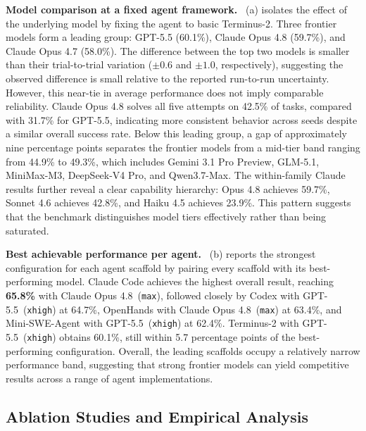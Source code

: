 \documentclass{llmxive}
\begin{document}
\noindent\textbf{Model comparison at a fixed agent framework.}
~(a) isolates the effect of the underlying model by fixing the agent to basic Terminus-2. Three frontier models form a leading group: GPT-5.5 (60.1\%), Claude Opus 4.8 (59.7\%), and Claude Opus 4.7 (58.0\%). The difference between the top two models is smaller than their trial-to-trial variation ($\pm0.6$ and $\pm1.0$, respectively), suggesting the observed difference is small relative to the reported run-to-run uncertainty. However, this near-tie in average performance does not imply comparable reliability. Claude Opus 4.8 solves all five attempts on 42.5\% of tasks, compared with 31.7\% for GPT-5.5, indicating more consistent behavior across seeds despite a similar overall success rate. Below this leading group, a gap of approximately nine percentage points separates the frontier models from a mid-tier band ranging from 44.9\% to 49.3\%, which includes Gemini 3.1 Pro Preview, GLM-5.1, MiniMax-M3, DeepSeek-V4 Pro, and Qwen3.7-Max. The within-family Claude results further reveal a clear capability hierarchy: Opus 4.8 achieves 59.7\%, Sonnet 4.6 achieves 42.8\%, and Haiku 4.5 achieves 23.9\%. This pattern suggests that the benchmark distinguishes model tiers effectively rather than being saturated.

\noindent\textbf{Best achievable performance per agent.}
~(b) reports the strongest configuration for each agent scaffold by pairing every scaffold with its best-performing model. Claude Code achieves the highest overall result, reaching \textbf{65.8\%} with Claude Opus 4.8~(\texttt{max}), followed closely by Codex with GPT-5.5~(\texttt{xhigh}) at 64.7\%, OpenHands with Claude Opus 4.8~(\texttt{max}) at 63.4\%, and Mini-SWE-Agent with GPT-5.5~(\texttt{xhigh}) at 62.4\%. Terminus-2 with GPT-5.5~(\texttt{xhigh}) obtains 60.1\%, still within 5.7 percentage points of the best-performing configuration. Overall, the leading scaffolds occupy a relatively narrow performance band, suggesting that strong frontier models can yield competitive results across a range of agent implementations.


\subsection{Ablation Studies and Empirical Analysis}
\end{document}
